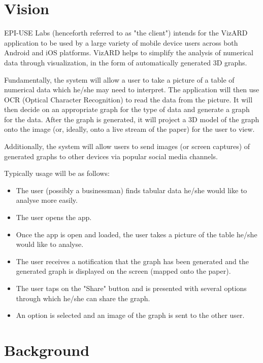\documentclass[a4paper,12pt]{article}
\begin{document}
\newpage
\section{Vision}
EPI-USE Labs (henceforth referred to as "the client") intends for the VizARD application to be used by a large variety of mobile device users across both Android and iOS platforms. VizARD helps to simplify the analysis of numerical data through visualization, in the form of automatically generated 3D graphs.

Fundamentally, the system will allow a user to take a picture of a table of numerical data which he/she may need to interpret. The application will then use OCR (Optical Character Recognition) to read the data from the picture. It will then decide on an appropriate graph for the type of data and generate a graph for the data. After the graph is generated, it will project a 3D model of the graph onto the image (or, ideally, onto a live stream of the paper) for the user to view.

Additionally, the system will allow users to send images (or screen captures) of generated graphs to other devices via popular social media channels.

Typically usage will be as follows:
\begin{itemize}
	\item The user (possibly a businessman) finds tabular data he/she would like to analyse more easily.
	\item The user opens the app.
	\item Once the app is open and loaded, the user takes a picture of the table he/she would like to analyse.
	\item The user receives a notification that the graph has been generated and the generated graph is displayed on the screen (mapped onto the paper).
	\item The user taps on the "Share" button and is presented with several options through which he/she can share the graph.
	\item An option is selected and an image of the graph is sent to the other user.
\end{itemize}

\newpage
\section{Background}
\end{document}
